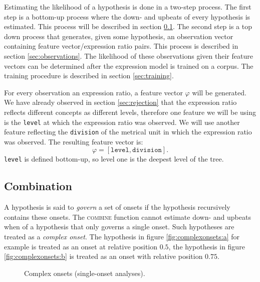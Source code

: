 Estimating the likelihood of a hypothesis is done in a two-step process. The first step is a bottom-up process where the down- and upbeats of every hypothesis is estimated. This process will be described in section \ref{sec:combination}. The second step is a top down process that generates, given some hypothesis, an observation vector containing feature vector/expression ratio pairs. This process is described in section \ref{sec:observations}. The likelihood of these observations given their feature vectors can be determined after the expression model is trained on a corpus. The training procedure is described in section \ref{sec:training}.

For every observation an expression ratio, a feature vector $\varphi$ will be generated. We have already observed in section \ref{sec:rejection} that the expression ratio reflects different concepts as different levels, therefore one feature we will be using is the \texttt{level} at which the expression ratio was observed. We will use another feature reflecting the \texttt{division} of the metrical unit in which the expression ratio was observed. The resulting feature vector is:
\begin{equation}
\label{eq:features}
\varphi = [\texttt{level}, \texttt{division}].
\end{equation}
\texttt{level} is defined bottom-up, so level one is the deepest level of the tree.


\subsection{Combination}
\label{sec:combination}

A hypothesis is said to \textit{govern} a set of onsets if the hypothesis recursively contains these onsets. The \textsc{combine} function cannot estimate down- and upbeats when of a hypothesis that only governs a single onset. Such hypotheses are treated as a \textit{complex onset}. The hypothesis in figure \ref{fig:complexonsets:a} for example is treated as an onset at relative position $0.5$, the hypothesis in figure \ref{fig:complexonsets:b} is treated as an onset with relative position $0.75$.

\begin{figure}
\centering
{}
\caption{Complex onsets (single-onset analyses).}
\label{fig:complexonsets}
\end{figure}

